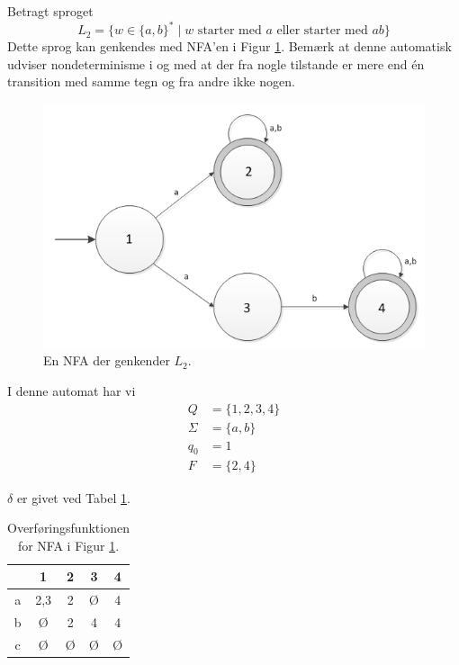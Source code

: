 \documentclass[a4paper,10pt,article]{memoir}
\begin{document}
\begin{eksempel}

Betragt sproget
%
\[L_2 = \{w \in \{a,b\}^{\ast} \mid w \text{ starter med $a$ eller starter med $ab$}\}\]
%
Dette sprog kan genkendes med NFA'en i Figur \ref{fig:4}. Bemærk at denne automatisk udviser nondeterminisme i og med at der fra nogle tilstande er mere end én transition med samme tegn og fra andre ikke nogen.

\begin{figure}[h]
\centering
\includegraphics[scale=0.8]{figur4.png}
\caption{En NFA der genkender $L_2$.}
\label{fig:4}
\end{figure}

I denne automat har vi
%
\begin{align*}
Q & = \{1,2,3,4\} \\
\Sigma & = \{a,b\} \\
q_0 & = 1 \\
F & = \{2,4\} 
\end{align*}

$\delta$ er givet ved Tabel \ref{tab:1}.

\begin{table}[h]
\begin{center}
    \begin{tabular}{c|c|c|c|c|}
        ~ & 1     & 2   & 3   & 4   \\ \hline
        a & {2,3} & {2} & Ø   & {4} \\ \hline
        b & Ø     & {2} & {4} & {4} \\ \hline
        c & Ø     & Ø   & Ø   & Ø   \\
        \hline
    \end{tabular}
\end{center}
\label{tab:1}
\caption{Overføringsfunktionen for NFA i Figur \ref{fig:4}.}
\end{table}

\end{eksempel}
\end{document}
